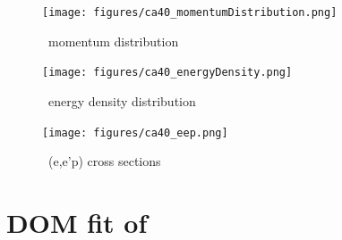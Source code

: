 \begin{figure}[H]
    \centering
    \texttt{[image: figures/ca40\_momentumDistribution.png]}
    \caption{\caForty\ momentum distribution}
    \label{DOMFitData_ca40_momentumDistribution}
\end{figure}

\begin{figure}[H]
    \centering
    \texttt{[image: figures/ca40\_energyDensity.png]}
    \caption{\caForty\ energy density distribution}
    \label{DOMFitData_ca40_energyDensity}
\end{figure}

\begin{figure}[H]
    \centering
    \texttt{[image: figures/ca40\_eep.png]}
    \caption{\caForty\ (e,e'p) cross sections}
    \label{DOMFitData_ca40_eep}
\end{figure}


\section{DOM fit of \caEight}

